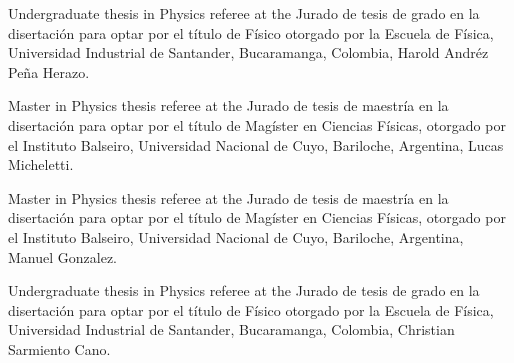 \ifeng
Undergraduate thesis in Physics referee at the  
\else
Jurado de tesis de grado en la disertación para optar por el título de Físico otorgado por la 
\fi
Escuela de Física, Universidad Industrial de Santander, Bucaramanga, Colombia, Harold Andréz Peña Herazo.

\ifeng
Master in Physics thesis referee at the
\else
Jurado de tesis de maestría en la disertación para optar por el título de Magíster en Ciencias Físicas, otorgado por el 
\fi
Instituto Balseiro, Universidad Nacional de Cuyo, Bariloche, Argentina, Lucas Micheletti.

\ifeng
Master in Physics thesis referee at the
\else
Jurado de tesis de maestría en la disertación para optar por el título de Magíster en Ciencias Físicas, otorgado por el 
\fi
Instituto Balseiro, Universidad Nacional de Cuyo, Bariloche, Argentina, Manuel Gonzalez.

\ifeng
Undergraduate thesis in Physics referee at the  
\else
Jurado de tesis de grado en la disertación para optar por el título de Físico otorgado por la 
\fi
Escuela de Física, Universidad Industrial de Santander, Bucaramanga, Colombia, Christian Sarmiento Cano.
